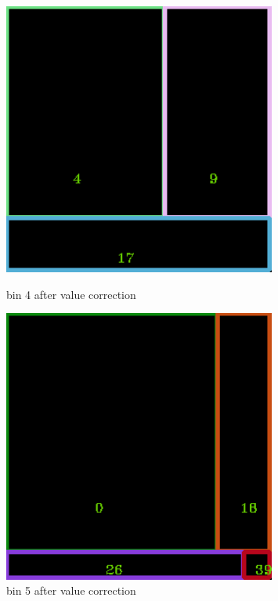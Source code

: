 \documentclass[11pt]{article}
\begin{document}
    \begin{figure}
    \begin{minipage}[htb]{0.33\linewidth}
    \centering
    \includegraphics[width=0.8\textwidth]{FIGS/2/output4.png}
    \caption{bin 4 after value correction}
    \label{skyline}
    \end{minipage}
    \begin{minipage}[htb]{0.33\linewidth}
    \centering
    \includegraphics[width=0.8\textwidth]{FIGS/2/output5.png}
    \caption{bin 5 after value correction}
    \label{skyline}
    \end{minipage}

\end{figure}
\end{document}
